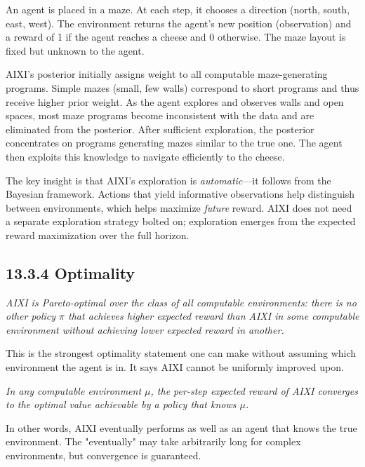 \begin{example}
An agent is placed in a maze. At each step, it chooses a direction (north, south, east, west). The environment returns the agent's new position (observation) and a reward of 1 if the agent reaches a cheese and 0 otherwise. The maze layout is fixed but unknown to the agent.

AIXI's posterior initially assigns weight to all computable maze-generating programs. Simple mazes (small, few walls) correspond to short programs and thus receive higher prior weight. As the agent explores and observes walls and open spaces, most maze programs become inconsistent with the data and are eliminated from the posterior. After sufficient exploration, the posterior concentrates on programs generating mazes similar to the true one. The agent then exploits this knowledge to navigate efficiently to the cheese.

The key insight is that AIXI's exploration is \textit{automatic}---it follows from the Bayesian framework. Actions that yield informative observations help distinguish between environments, which helps maximize \textit{future} reward. AIXI does not need a separate exploration strategy bolted on; exploration emerges from the expected reward maximization over the full horizon.
\end{example}

\subsection{13.3.4 Optimality}

\begin{theorem}
\textit{AIXI is Pareto-optimal over the class of all computable environments: there is no other policy $\pi$ that achieves higher expected reward than AIXI in some computable environment without achieving lower expected reward in another.}

This is the strongest optimality statement one can make without assuming which environment the agent is in. It says AIXI cannot be uniformly improved upon.
\end{theorem}

\begin{theorem}
\textit{In any computable environment $\mu$, the per-step expected reward of AIXI converges to the optimal value achievable by a policy that knows $\mu$.}

In other words, AIXI eventually performs as well as an agent that knows the true environment. The "eventually" may take arbitrarily long for complex environments, but convergence is guaranteed.
\end{theorem}

